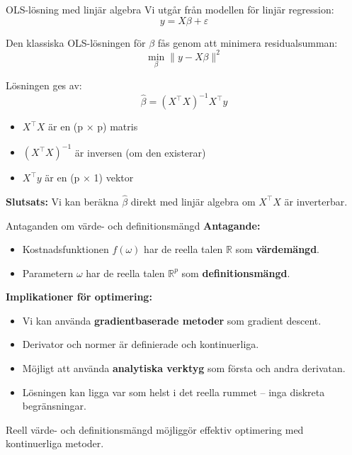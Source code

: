 \documentclass[10pt,english]{beamer}
\begin{document}
\begin{frame}{OLS-lösning med linjär algebra}
    Vi utgår från modellen för linjär regression:
    \[
    y = X\beta + \varepsilon
    \]

    \vspace{0.3cm}
    Den klassiska OLS-lösningen för $\beta$ fås genom att minimera residualsumman:
    \[
    \min_\beta \| y - X\beta \|^2
    \]

    \vspace{0.3cm}
    Lösningen ges av:
    \[
    \hat{\beta} = (X^\top X)^{-1} X^\top y
    \]

    \begin{itemize}
        \item $X^\top X$ är en (p × p) matris
        \item $(X^\top X)^{-1}$ är inversen (om den existerar)
        \item $X^\top y$ är en (p × 1) vektor
    \end{itemize}

    \textbf{Slutsats:} Vi kan beräkna $\hat{\beta}$ direkt med linjär algebra om $X^\top X$ är inverterbar.
\end{frame}

\begin{frame}{Antaganden om värde- och definitionsmängd}
    \textbf{Antagande:}
    \begin{itemize}
        \item Kostnadsfunktionen $f(\omega)$ har de reella talen $\mathbb{R}$ som \textbf{värdemängd}.
        \item Parametern $\omega$ har de reella talen $\mathbb{R}^p$ som \textbf{definitionsmängd}.
    \end{itemize}

    \vspace{0.4cm}
    \textbf{Implikationer för optimering:}
    \begin{itemize}
        \item Vi kan använda \textbf{gradientbaserade metoder} som gradient descent.
        \item Derivator och normer är definierade och kontinuerliga.
        \item Möjligt att använda \textbf{analytiska verktyg} som första och andra derivatan.
        \item Lösningen kan ligga var som helst i det reella rummet – inga diskreta begränsningar.
    \end{itemize}

    Reell värde- och definitionsmängd möjliggör effektiv optimering med kontinuerliga metoder.
\end{frame}
\end{document}
